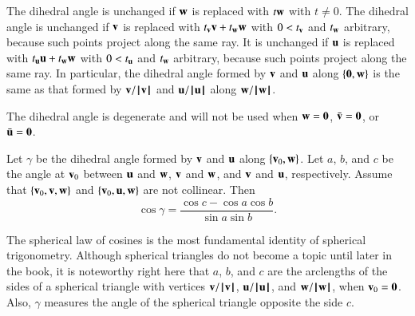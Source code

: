 \begin{remark}\label{rem:dih}
The dihedral angle is unchanged if $\w$ is replaced with $t \w$ with
$t\ne0$. The dihedral angle is unchanged if $\v$ is replaced with
$t_\v \v + t_\w \w$ with $0 < t_\v$ and $t_\w$ arbitrary, because such points project along the same ray.  
It is unchanged if
$\u$ is replaced with $t_\u \u + t_\w \w$ with $0 < t_\u$ and $t_\w$
arbitrary, because such points project along the same ray.  In particular, the dihedral angle formed by $\v$ and
$\u$ along $\{\orz,\w\}$ is the same as that formed by $\v/\normo{\v}$ and
$\u/\normo{\u}$ along $\w/\normo{\w}$.
\end{remark}

The dihedral angle is degenerate and will not be used when $\w =
\orz$, $\bar \v = \orz$, or $\bar \u = \orz$.

\begin{lemma}\label{lemma:sloc}
Let $\gamma$ be the dihedral angle formed by $\v$ and $\u$ along
$\{\v_0,\w\}$.  Let $a$, $b$, and $c$ be the
angle at $\v_0$ between $\u$ and $\w$, $\v$ and $\w$, and $\v$ and
$\u$, respectively. %
Assume that $\{\v_0,\v,\w\}$ and $\{\v_0,\u,\w\}$ are not collinear.
Then
    \begin{displaymath}\cos\gamma = \frac{\cos c - \cos a \cos b}{\sin a\sin b}.\end{displaymath}
\end{lemma}
%
%
%

The spherical law of cosines is the most fundamental identity of spherical trigonometry.    Although  spherical
triangles do not become a topic until later in the book, it is noteworthy right here that $a$, $b$, and $c$ are
the arclengths of the sides of a spherical triangle with
vertices $\v/\normo{\v}$, $\u/\normo{\u}$, and $\w/\normo{\w}$,  when $\v_0=\orz$.  Also,
$\gamma$ measures the angle of the spherical triangle opposite the
side $c$.
%
%


